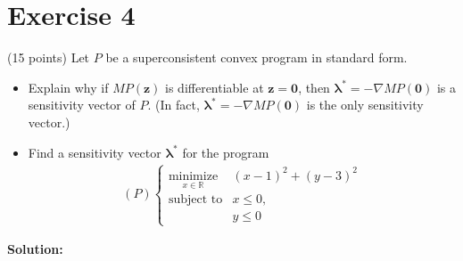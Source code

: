 \documentclass{article}
\begin{document}
\section*{Exercise 4}
(15 points) Let $P$ be a superconsistent convex program in standard form.
\begin{itemize}
\item Explain why if $MP(\mathbf{z})$ is differentiable at $\mathbf{z} = \mathbf{0}$, then $\boldsymbol{\lambda}^* = -\nabla MP(\mathbf{0})$ is a sensitivity vector of $P$. (In fact, $\boldsymbol{\lambda}^* = -\nabla MP(\mathbf{0})$ is the only sensitivity vector.)
\item Find a sensitivity vector $\boldsymbol{\lambda}^*$ for the program
\begin{align*}
(P) \begin{cases}
\underset{x\in\mathbb{R}}{\text{minimize}} & (x - 1)^2 + (y - 3)^2 \\
\text{subject to} & x \leq 0, \\
& y \leq 0
\end{cases}
\end{align*}
\end{itemize}

\textbf{Solution:} \\
\end{document}
